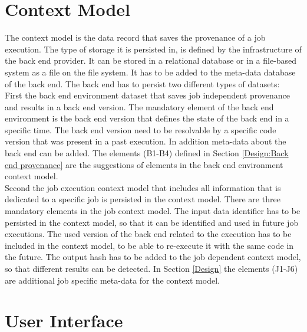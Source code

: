 \documentclass[draft,final]{vutinfth} %
\begin{document}
\section{Context Model}\label{Design:Context Model}

The context model is the data record that saves the provenance of a job execution. The type of storage it is persisted in,  is defined by the infrastructure of the back end provider. It can be stored in a relational database or in a file-based system as a file on the file system. It has to be added to the meta-data database of the back end. The back end has to persist two different types of datasets: \\
First the back end environment dataset that saves job independent provenance and results in a back end version. The mandatory element of the back end environment is the back end version that defines the state of the back end in a specific time. The back end version need to be resolvable by a specific code version that was present in a past execution. In addition meta-data about the back end can be added. The elements (B1-B4) defined in Section \ref{Design:Back end provenance} are the suggestions of elements in the back end environment context model.\\
Second the job execution context model that includes all information that is dedicated to a specific job is persisted in the context model. There are three mandatory elements in the job context model. The input data identifier has to be persisted in the context model, so that it can be identified and used in future job executions. The used version of the back end related to the execution has to be included in the context model, to be able to re-execute it with the same code in the future. The output hash has to be added to the job dependent context model, so that different results can be detected. In Section \ref{Design} the elements (J1-J6) are additional job specific meta-data for the context model.  



\section{User Interface}\label{Design:User Interface}
\end{document}
